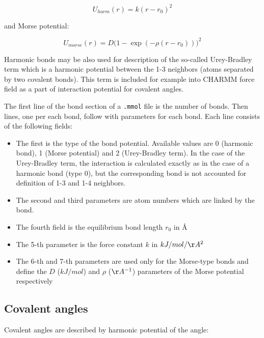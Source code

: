 \documentclass{article}
\begin{document}
\begin{equation}
\label{harm}
U_{harm}(r) = k(r - r_0)^2
\end{equation}

and Morse potential:

\begin{equation}
\label{morse}
U_{morse}(r) = D\big(1-\exp(-\rho(r-r_0))\big)^2
\end{equation}

Harmonic bonds may be also used for description of the so-called
Urey-Bradley term which is a harmonic potential between the 1-3 neighbors
(atoms separated by two covalent bonds). This term is included for 
example into CHARMM force field as a part of interaction potential for
covalent angles.

The first line of the bond section of a \verb|.mmol| file is the number 
of bonds. Then lines, one per each bond, follow with parameters for each bond.
Each line consists of the following fields:

\begin{itemize}
\item
The first is the type of the bond potential. Available values are 0 
(harmonic bond), 1 (Morse potential) and 2 (Urey-Bradley term). In the case
of the Urey-Bradley term, the interaction is calculated exactly as in the
case of a harmonic bond (type 0), but the corresponding bond is not accounted
for definition of 1-3 and 1-4 neighbors.

\item
The second and third parameters are atom numbers which are linked by the bond. 

\item
The fourth field is the equilibrium bond length $r_0$ in \AA 

\item
The 5-th parameter is the force constant $k$
in $kJ/mol/\AA^2$  

\item
The 6-th and 7-th parameters are used only for the Morse-type bonds
and define the $D$ ($kJ/mol$) and $\rho$ ($\AA^{-1}$) parameters 
of the Morse potential respectively
\end{itemize}

\subsection{Covalent angles}

Covalent angles are described by harmonic potential of the angle:
\end{document}
